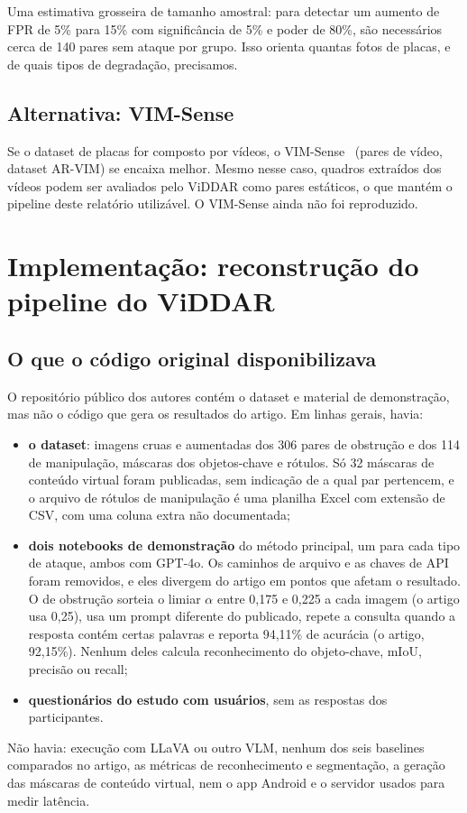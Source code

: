\documentclass[journal,onecolumn]{IEEEtran}
\begin{document}
Uma estimativa grosseira de tamanho amostral: para detectar um aumento de FPR de 5\% para 15\% com
significância de 5\% e poder de 80\%, são necessários cerca de 140 pares sem ataque por grupo. Isso
orienta quantas fotos de placas, e de quais tipos de degradação, precisamos.

\subsection{Alternativa: VIM-Sense}
Se o dataset de placas for composto por vídeos, o VIM-Sense~\cite{vimsense} (pares de vídeo, dataset
AR-VIM) se encaixa melhor. Mesmo nesse caso, quadros extraídos dos vídeos podem ser avaliados pelo
ViDDAR como pares estáticos, o que mantém o pipeline deste relatório utilizável. O VIM-Sense ainda não
foi reproduzido.

\section{Implementação: reconstrução do pipeline do ViDDAR}
\label{sec:impl}

\subsection{O que o código original disponibilizava}
O repositório público dos autores contém o dataset e material de demonstração, mas não o código que
gera os resultados do artigo. Em linhas gerais, havia:
\begin{itemize}
\item \textbf{o dataset}: imagens cruas e aumentadas dos 306 pares de obstrução e dos 114 de
  manipulação, máscaras dos objetos-chave e rótulos. Só 32 máscaras de conteúdo virtual foram
  publicadas, sem indicação de a qual par pertencem, e o arquivo de rótulos de manipulação é uma
  planilha Excel com extensão de CSV, com uma coluna extra não documentada;
\item \textbf{dois notebooks de demonstração} do método principal, um para cada tipo de ataque, ambos
  com GPT-4o. Os caminhos de arquivo e as chaves de API foram removidos, e eles divergem do artigo em
  pontos que afetam o resultado. O de obstrução sorteia o limiar $\alpha$ entre 0,175 e 0,225 a cada
  imagem (o artigo usa 0,25), usa um prompt diferente do publicado, repete a consulta quando a
  resposta contém certas palavras e reporta 94,11\% de acurácia (o artigo, 92,15\%). Nenhum deles
  calcula reconhecimento do objeto-chave, mIoU, precisão ou recall;
\item \textbf{questionários do estudo com usuários}, sem as respostas dos participantes.
\end{itemize}
Não havia: execução com LLaVA ou outro VLM, nenhum dos seis baselines comparados no artigo, as
métricas de reconhecimento e segmentação, a geração das máscaras de conteúdo virtual, nem o app
Android e o servidor usados para medir latência.
\end{document}
